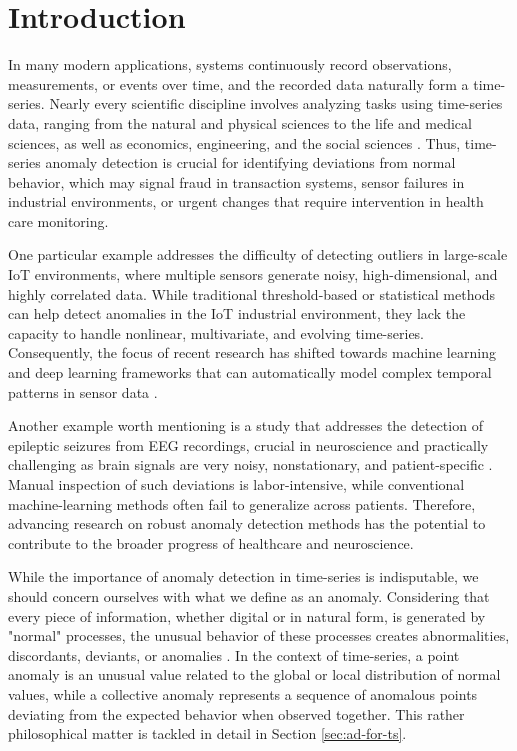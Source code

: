\chapter{Introduction}

In many modern applications, systems continuously record observations, measurements, or events over time, and the recorded data naturally form a time-series. Nearly every scientific discipline involves analyzing tasks using time-series data, ranging from the natural and physical sciences to the life and medical sciences, as well as economics, engineering, and the social sciences \cite{boniol2024ts-ad-review}. Thus, time-series anomaly detection is crucial for identifying deviations from normal behavior, which may signal fraud in transaction systems, sensor failures in industrial environments, or urgent changes that require intervention in health care monitoring.

One particular example addresses the difficulty of detecting outliers in large-scale IoT environments, where multiple sensors generate noisy, high-dimensional, and highly correlated data. While traditional threshold-based or statistical methods can help detect anomalies in the IoT industrial environment, they lack the capacity to handle nonlinear, multivariate, and evolving time-series. Consequently, the focus of recent research has shifted towards machine learning and deep learning frameworks that can automatically model complex temporal patterns in sensor data \cite{li2019madgan} \cite{yin2020iot-one-ts-ad} \cite{tuli2022iot-two-ts-ad}.

Another example worth mentioning is a study that addresses the detection of epileptic seizures from EEG recordings, crucial in neuroscience and practically challenging as brain signals are very noisy, nonstationary, and patient-specific \cite{wang2024seizure-ts-ad}. Manual inspection of such deviations is labor-intensive, while conventional machine-learning methods often fail to generalize across patients. Therefore, advancing research on robust anomaly detection methods has the potential to contribute to the broader progress of healthcare and neuroscience.

While the importance of anomaly detection in time-series is indisputable, we should concern ourselves with what we define as an anomaly. Considering that every piece of information, whether digital or in natural form, is generated by "normal" processes, the unusual behavior of these processes creates abnormalities, discordants, deviants, or anomalies \cite{aggarwal2016an-introduction-to-outlier-analysis}. In the context of time-series, a point anomaly is an unusual value related to the global or local distribution of normal values, while a collective anomaly represents a sequence of anomalous points deviating from the expected behavior when observed together. This rather philosophical matter is tackled in detail in Section \ref{sec:ad-for-ts}.

